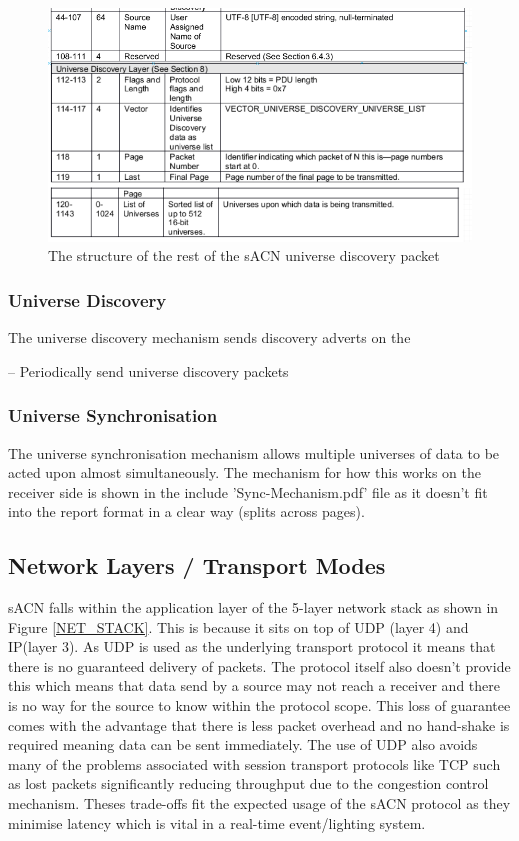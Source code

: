 \documentclass[11pt,a4paper]{article}
\begin{document}
\begin{figure}[H]
\label{ACN_REST_DISCOVERY_PACKET}
\includegraphics[width=\textwidth]{acn_discovery_packet_specific_structure}
\caption{The structure of the rest of the sACN universe discovery packet}
\end{figure}

\subsubsection{Universe Discovery}
The universe discovery mechanism sends discovery adverts on the 

-- Periodically send universe discovery packets

\subsubsection{Universe Synchronisation}
The universe synchronisation mechanism allows multiple universes of data to be acted upon almost simultaneously. The mechanism for how this works on the receiver side is shown in the include 'Sync-Mechanism.pdf' file as it doesn't fit into the report format in a clear way (splits across pages).

\subsection{Network Layers / Transport Modes}
sACN falls within the application layer of the 5-layer network stack as shown in Figure \ref{NET_STACK}. This is because it sits on top of UDP (layer 4) and IP(layer 3). As UDP is used as the underlying transport protocol it means that there is no guaranteed delivery of packets. The protocol itself also doesn't provide this which means that data send by a source may not reach a receiver and there is no way for the source to know within the protocol scope. This loss of guarantee comes with the advantage that there is less packet overhead and no hand-shake is required meaning data can be sent immediately. The use of UDP also avoids many of the problems associated with session transport protocols like TCP such as lost packets significantly reducing throughput due to the congestion control mechanism. Theses trade-offs fit the expected usage of the sACN protocol as they minimise latency which is vital in a real-time event/lighting system. \\
\end{document}
